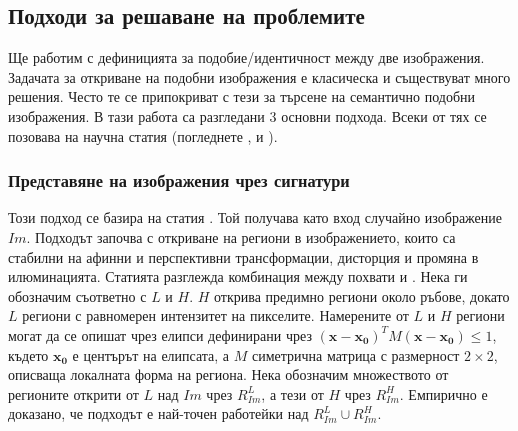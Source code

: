\documentclass[a4paper,12pt]{article}
\begin{document}
\subsection{Подходи за решаване на проблемите}

Ще работим с дефиницията за подобие/идентичност между две изображения. Задачата за откриване на подобни изображения е класическа и съществуват много решения. Често те се припокриват с тези за търсене на семантично подобни изображения. В тази работа са разгледани 3 основни подхода. Всеки от тях се позовава на научна статия (погледнете \cite{spinimages}, \cite{sift} и \cite{vocabularytree}).

\subsubsection{Представяне на изображения чрез сигнатури}

Този подход се базира на статия \cite{spinimages}. Той получава като вход случайно изображение $Im$. Подходът започва с откриване на региони в изображението, които са стабилни на афинни и перспективни трансформации, дисторция и промяна в илюминацията. Статията разглежда комбинация между похвати \cite{shapeadaptedsmoothingfor3dcues} и \cite{affineinvariantipdetector}. Нека ги обозначим съответно с $L$ и $H$. $H$ открива предимно региони около ръбове, докато $L$ региони с равномерен интензитет на пикселите. Намерените от $L$ и $H$ региони могат да се опишат чрез елипси дефинирани чрез $(\mathbf{x}-\mathbf{x_0})^T M (\mathbf{x}-\mathbf{x_0}) \leq 1$, където $\mathbf{x_0}$ е центърът на елипсата, а $M$ симетрична матрица с размерност $2\times2$, описваща локалната форма на региона. Нека обозначим множеството от регионите открити от $L$ над $Im$ чрез $R_{Im}^L$, а тези от $H$ чрез $R_{Im}^H$. Емпирично е доказано, че подходът е най-точен работейки над $R_{Im}^L \cup R_{Im}^H$.

\bigbreak
\end{document}

